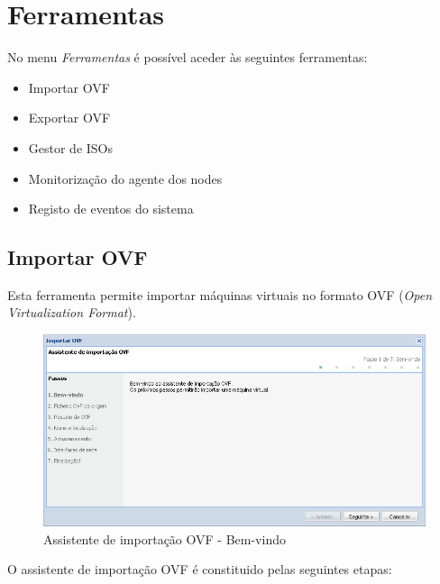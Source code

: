 \section{Ferramentas}

No menu \emph{Ferramentas} é possível aceder às seguintes ferramentas:
\begin{itemize}
\item Importar OVF
\item Exportar OVF
\item Gestor de ISOs
\item Monitorização do agente dos nodes
\item Registo de eventos do sistema
\end{itemize}

\subsection{Importar OVF}
Esta ferramenta permite importar máquinas virtuais no formato OVF (\emph{Open Virtualization Format}).

\begin{figure}[H]
	\begin{center}
	\includegraphics[scale=0.5]{screenshots/ovf_import.png}
	\caption{Assistente de importação OVF - Bem-vindo}
	\label{fig:ovf_import_wiz}
	\end{center}
\end{figure}

O assistente de importação OVF é constituido pelas seguintes etapas:

